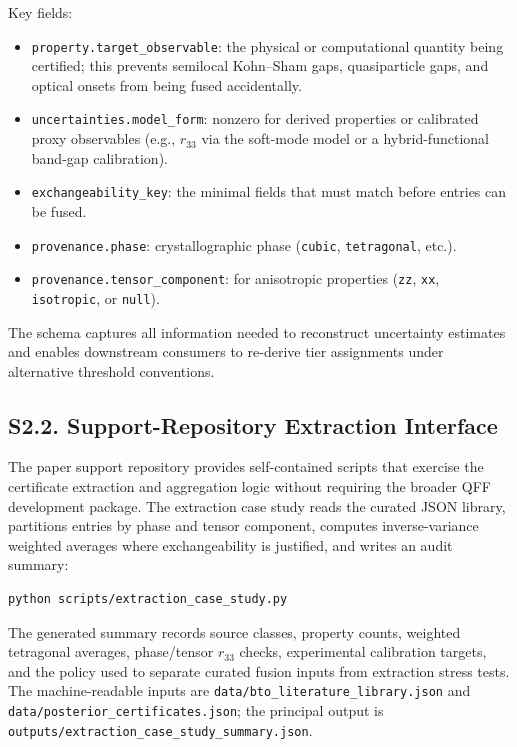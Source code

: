 ﻿\documentclass[prb,onecolumn,superscriptaddress,amsmath,amssymb,longbibliography]{revtex4-2}
\begin{document}
Key fields:
\begin{itemize}
    \item \texttt{property.target\_observable}: the physical or computational
    quantity being certified; this prevents semilocal Kohn--Sham gaps,
    quasiparticle gaps, and optical onsets from being fused accidentally.
    \item \texttt{uncertainties.model\_form}: nonzero for derived properties
    or calibrated proxy observables (e.g., $r_{33}$ via the soft-mode model or
    a hybrid-functional band-gap calibration).
    \item \texttt{exchangeability\_key}: the minimal fields that must match
    before entries can be fused.
    \item \texttt{provenance.phase}: crystallographic phase
    (\texttt{cubic}, \texttt{tetragonal}, etc.).
    \item \texttt{provenance.tensor\_component}: for anisotropic properties
    (\texttt{zz}, \texttt{xx}, \texttt{isotropic}, or \texttt{null}).
\end{itemize}

The schema captures all information needed to reconstruct uncertainty
estimates and enables downstream consumers to re-derive tier assignments
under alternative threshold conventions.


\subsection{S2.2. Support-Repository Extraction Interface}

The paper support repository provides self-contained scripts that exercise the
certificate extraction and aggregation logic without requiring the broader QFF
development package. The extraction case study reads the curated JSON library,
partitions entries by phase and tensor component, computes inverse-variance
weighted averages where exchangeability is justified, and writes an audit
summary:

\begin{verbatim}
python scripts/extraction_case_study.py
\end{verbatim}

The generated summary records source classes, property counts, weighted
tetragonal averages, phase/tensor $r_{33}$ checks, experimental calibration
targets, and the policy used to separate curated fusion inputs from extraction
stress tests. The machine-readable inputs are
\texttt{data/bto\_literature\_library.json} and
\texttt{data/posterior\_certificates.json}; the principal output is
\texttt{outputs/extraction\_case\_study\_summary.json}.
\end{document}
